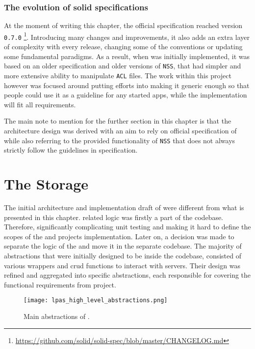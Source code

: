 \subsubsection{The evolution of solid specifications}

At the moment of writing this chapter, the official \solid{} specification reached version \texttt{0.7.0} \footnote{\url{https://github.com/solid/solid-spec/blob/master/CHANGELOG.md}}. Introducing many changes and improvements, it also adds an extra layer of complexity with every release, changing some of the conventions or updating some fundamental paradigms. As a result, when \lpa{} was initially implemented, it was based on an older specification and older versions of \texttt{NSS}, that had simpler and more extensive ability to manipulate \texttt{ACL} files. The work within this project however was focused around putting efforts into making it generic enough so that people could use it as a guideline for any started \solid{} apps, while the implementation will fit all \lpa{} requirements.

The main note to mention for the further section in this chapter is that the architecture design was derived with an aim to rely on official specification of \solid{} while also referring to the provided functionality of \texttt{NSS} that does not always strictly follow the guidelines in specification. 


\section{The Storage}

The initial architecture and implementation draft of \lpas{} were different from what is presented in this chapter.  \solid{} related logic was firstly a part of the \lpa{} codebase. Therefore, significantly complicating unit testing and making it hard to define the scopes of the \lpa{} and \lpas{} projects implementation. Later on, a decision was made to separate the logic of the \lpas{} and move it in the separate codebase. The majority of abstractions that were initially designed to be inside the \lpa{} codebase, consisted of various wrappers and crud functions to interact with \solid{} servers. Their design was refined and aggregated into specific abstractions, each responsible for covering the functional requirements from \lpa{} project.

\begin{figure}[h]
\centering
\texttt{[image: lpas\_high\_level\_abstractions.png]}
\caption{Main abstractions of \lpas.}
\label{fig:lpas_high_level_abstractions}
\end{figure}

